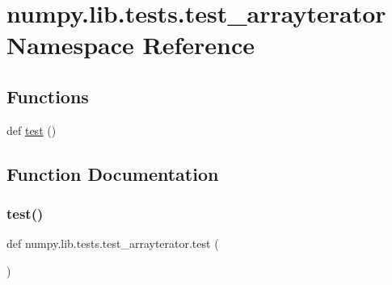 \hypertarget{namespacenumpy_1_1lib_1_1tests_1_1test__arrayterator}{}\section{numpy.\+lib.\+tests.\+test\+\_\+arrayterator Namespace Reference}
\label{namespacenumpy_1_1lib_1_1tests_1_1test__arrayterator}
\subsection*{Functions}
\begin{DoxyCompactItemize}
\item 
def \hyperlink{namespacenumpy_1_1lib_1_1tests_1_1test__arrayterator_af785f94104bcc85bedd3783ee0f17418}{test} ()
\end{DoxyCompactItemize}


\subsection{Function Documentation}
\mbox{\label{namespacenumpy_1_1lib_1_1tests_1_1test__arrayterator_af785f94104bcc85bedd3783ee0f17418}} 
\subsubsection{\texorpdfstring{test()}{test()}}
{\footnotesize\ttfamily def numpy.\+lib.\+tests.\+test\+\_\+arrayterator.\+test (\begin{DoxyParamCaption}{ }\end{DoxyParamCaption})}

